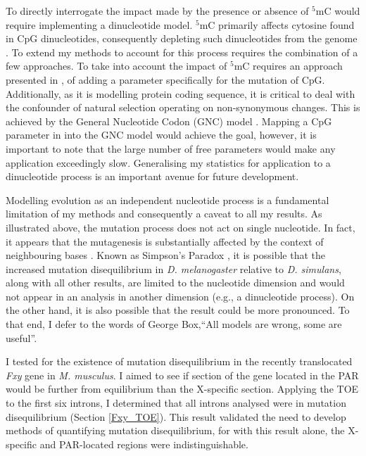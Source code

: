 To directly interrogate the impact made by the presence or absence of $^5$mC would require implementing a dinucleotide model. $^5$mC primarily affects cytosine found in CpG dinucleotides, consequently depleting such dinucleotides from the genome \citep{Holliday1975DNADevelopment, Bird1980DNADNA}. To extend my methods to account for this process requires the combination of a few approaches. To take into account the impact of $^5$mC requires an approach presented in \cite{Huttley2004ModelingMammals}, of adding a parameter specifically for the mutation of CpG. Additionally, as it is modelling protein coding sequence, it is critical to deal with the confounder of natural selection operating on non-synonymous changes. This is achieved by the General Nucleotide Codon (GNC) model \citep{Kaehler2017StandardData}. Mapping a CpG parameter in into the GNC model would achieve the goal, however, it is important to note that the large number of free parameters would make any application exceedingly slow. Generalising my statistics for application to a dinucleotide process is an important avenue for future development. 

Modelling evolution as an independent nucleotide process is a fundamental limitation of my methods and consequently a caveat to all my results. As illustrated above, the mutation process does not act on single nucleotide. In fact, it appears that the mutagenesis is substantially affected by the context of neighbouring bases \citep{Zhu2020MachineMutations}. Known as Simpson's Paradox \citep{Simpson1951TheTables}, it is possible that the increased mutation disequilibrium in \textit{D. melanogaster} relative to \textit{D. simulans}, along with all other results, are limited to the nucleotide dimension and would not appear in an analysis in another dimension (e.g., a  dinucleotide process). On the other hand, it is also possible that the result could be more pronounced. To that end, I defer to the words of George Box,``All models are wrong, some are useful''. 

I tested for the existence of mutation disequilibrium in the recently translocated \textit{Fxy} gene in \textit{M. musculus}. I aimed to see if section of the gene located in the PAR would be further from equilibrium than the X-specific section. Applying the TOE to the first six introns, I determined that all introns analysed were in mutation disequilibrium (Section \ref{Fxy_TOE}). This result validated the need to develop methods of quantifying mutation disequilibrium, for with this result alone, the X-specific and PAR-located regions were indistinguishable.


